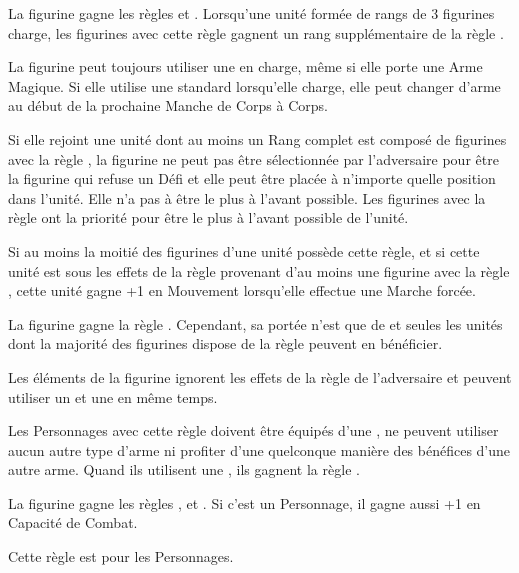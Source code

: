 \armyspecialruleentry{\lanceformation}

La figurine gagne les règles \monstrousranks{} et \fightinextrarank{}. Lorsqu'une unité formée de rangs de 3 figurines charge, les figurines avec cette règle gagnent un rang supplémentaire de la règle \fightinextrarank{}. 

\armyspecialruleentry{\jousting}

La figurine peut toujours utiliser une \lance{} en charge, même si elle porte une Arme Magique. Si elle utilise une \lance{} standard lorsqu'elle charge, elle peut changer d'arme au début de la prochaine Manche de Corps à Corps.

\armyspecialruleentry{\beloved}

Si elle rejoint une unité dont au moins un Rang complet est composé de figurines avec la règle \lanceformation{}, la figurine ne peut pas être sélectionnée par l'adversaire pour être la figurine qui refuse un Défi et elle peut être placée à n'importe quelle position dans l'unité. Elle n'a pas à être le plus à l'avant possible. Les figurines avec la règle \frontrank{} ont la priorité pour être le plus à l'avant possible de l'unité.

\armyspecialruleentry{\serfs}

Si au moins la moitié des figurines d'une unité possède cette règle, et si cette unité est sous les effets de la règle \inspiringpresence{} provenant d'au moins une figurine avec la règle \oathoffealty{}, cette unité gagne +1 en Mouvement lorsqu'elle effectue une Marche forcée.

\armyspecialruleentry{\oathoffealty}

La figurine gagne la règle \inspiringpresence{}. Cependant, sa portée n'est que de  et seules les unités dont la majorité des figurines dispose de la règle \serfs{} peuvent en bénéficier.

\setlength{\columnseprule}{0.5pt}
\renewcommand{\columnseprulecolor}{\color{black!30}}
\begin{multicols}{2}\raggedcolumns
\armyspecialruleentry{\questingoath}

Les éléments de la figurine ignorent les effets de la règle \fear{} de l'adversaire et peuvent utiliser un \shield{} et une \gw{} en même temps.

\vspace*{5pt}
Les Personnages avec cette règle doivent être équipés d'une \gw{}, ne peuvent utiliser aucun autre type d'arme ni profiter d'une quelconque manière des bénéfices d'une autre arme. Quand ils utilisent une \gw{}, ils gagnent la règle .

\columnbreak
\armyspecialruleentry{\grailoath}

La figurine gagne les règles \magicalattacks{}, \immunetopsychology{} et . Si c'est un Personnage, il gagne aussi +1 en Capacité de Combat.

\vspace*{5pt}
Cette règle est \oneofakind{} pour les Personnages.
\end{multicols}
\setlength{\columnseprule}{0pt}

